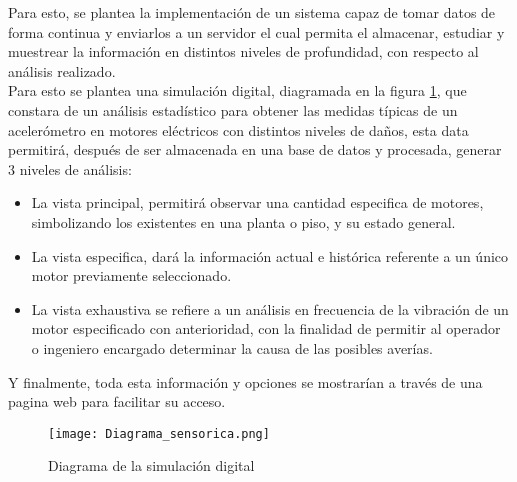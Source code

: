 

Para esto, se plantea la implementación de un sistema capaz de tomar datos de forma continua y enviarlos a un servidor el cual permita el almacenar, estudiar y muestrear la información en distintos niveles de profundidad, con respecto al análisis realizado.\\
Para esto se plantea una simulación digital, diagramada en la figura \ref{fig:diagrama}, que constara de un análisis estadístico para obtener las medidas típicas de un acelerómetro en motores eléctricos con distintos niveles de daños, esta data permitirá, después de ser almacenada en una base de datos y procesada, generar 3 niveles de análisis:\\
\begin{itemize}
\item La vista principal, permitirá observar una cantidad especifica de motores, simbolizando los existentes en una planta o piso, y su estado general.

\item La vista especifica, dará la información actual e histórica referente a un único motor previamente seleccionado.

\item La vista exhaustiva se refiere a un análisis en frecuencia de la vibración de un motor especificado con anterioridad, con la finalidad de permitir al operador o ingeniero encargado determinar la causa de las posibles averías.
\end{itemize}


Y finalmente, toda esta información y opciones se mostrarían a través de una pagina web para facilitar su acceso.

\begin{figure}[htb]
\centering
\texttt{[image: Diagrama\_sensorica.png]}
\caption{Diagrama de la simulación digital}
\label{fig:diagrama}
\end{figure}


